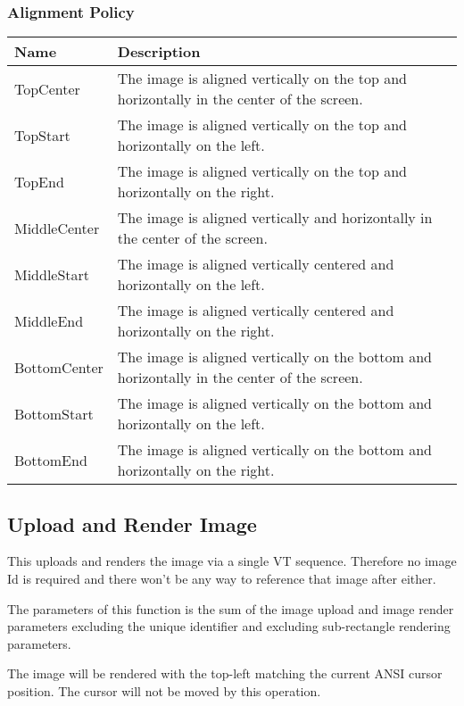 \documentclass[a4paper]{article}
\begin{document}
\subsubsection*{Alignment Policy}

\begin{tabular}{ |l|l| }
    \hline
    \textbf{Name}          & \textbf{Description} \\
    \hline
    TopCenter     & The image is aligned vertically on the top and horizontally in the center of the screen. \\
    TopStart      & The image is aligned vertically on the top and horizontally on the left. \\
    TopEnd        & The image is aligned vertically on the top and horizontally on the right. \\
    \hline
    MiddleCenter  & The image is aligned vertically and horizontally in the center of the screen. \\
    MiddleStart   & The image is aligned vertically centered and horizontally on the left. \\
    MiddleEnd     & The image is aligned vertically centered and horizontally on the right. \\
    \hline
    BottomCenter  & The image is aligned vertically on the bottom and horizontally in the center of
    the screen. \\
    BottomStart   & The image is aligned vertically on the bottom and horizontally on the left. \\
    BottomEnd     & The image is aligned vertically on the bottom and horizontally on the right. \\
    \hline
\end{tabular}

\subsection{Upload and Render Image}

This uploads and renders the image via a single VT sequence. Therefore no image Id
is required and there won't be any way to reference that image after either.

The parameters of this function is the sum of the image upload and image render parameters excluding the unique
identifier and excluding sub-rectangle rendering parameters.

The image will be rendered with the top-left matching the current ANSI cursor position.
The cursor will not be moved by this operation.
\end{document}
